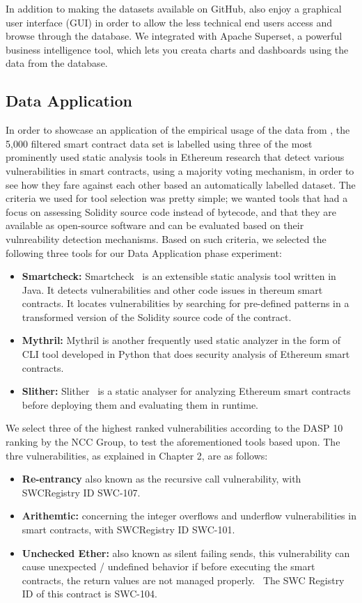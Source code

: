 	In addition to making the datasets available on GitHub, \etherbase also enjoy a graphical user interface (GUI) in order to allow the less technical end users access
	and browse through the database.
	We integrated \etherbase with Apache Superset, a powerful business intelligence tool, which lets you creata charts and dashboards using the data from the database.

\subsection{Data Application}
	In order to showcase an application of the empirical usage of the data from \etherbase, 
	the 5,000 filtered smart contract data set is labelled using three of the most prominently used static analysis tools in Ethereum research that detect
	various vulnerabilities in smart contracts, using a majority voting mechanism, in order to see how they fare against each other based an automatically labelled dataset.
	The criteria we used for tool selection was pretty simple; we wanted tools that had a focus on assessing Solidity source code instead of bytecode,
	and that they are available as open-source software and can be evaluated based on their vulnreability detection mechanisms.
	Based on such criteria, we selected the following three tools for our Data Application phase experiment:
	\begin{itemize}
		\item \textbf{Smartcheck:} Smartcheck~\cite{smartcheck} is an extensible static analysis tool written in Java. It detects vulnerabilities and other code issues in thereum smart contracts. It locates vulnerabilities by searching for pre-defined patterns in a transformed version of the Solidity source code of the contract.
		\item \textbf{Mythril:} Mythril is another frequently used static analyzer in the form of CLI tool developed in Python that does security analysis of Ethereum smart contracts.
		\item \textbf{Slither:} Slither~\cite{slither} is a static analyser for analyzing Ethereum smart contracts before deploying them and evaluating them in runtime.
	\end{itemize}
	
	
	We select three of the highest ranked vulnerabilities according to the DASP 10 ranking by the NCC Group, to test the aforementioned tools based upon.
	The thre vulnerabilities, as explained in Chapter 2, are as follows:
	\begin{itemize}
		\item \textbf{Re-entrancy} also known as the recursive call vulnerability, with SWCRegistry ID SWC-107.
		\item \textbf{Arithemtic:} concerning the integer overflows and underflow vulnerabilities in smart contracts, with SWCRegistry ID SWC-101.
		\item \textbf{Unchecked Ether:} also known as silent failing sends, this vulnerability can cause unexpected / undefined behavior if before executing the smart contracts, the return values are not managed properly.~\cite{dasp} The SWC Registry ID of this contract is SWC-104.~\cite{swcregistry}
	\end{itemize} 
	
